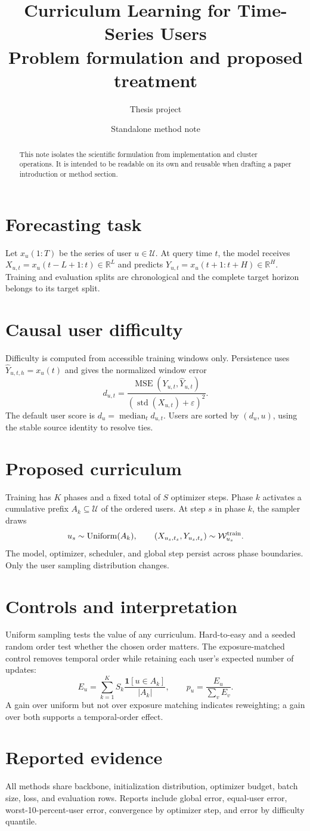 \documentclass[10pt]{article}
\title{\color{navy}Curriculum Learning for Time-Series Users\\[3pt]\large Problem formulation and proposed treatment}
\author{Thesis project}
\date{Standalone method note}
\newcommand{\R}{\mathbb{R}}
\begin{document}
\maketitle
\begin{abstract}
This note isolates the scientific formulation from implementation and cluster
operations. It is intended to be readable on its own and reusable when drafting
a paper introduction or method section.
\end{abstract}

\section{Forecasting task}
Let $x_u(1{:}T)$ be the series of user $u\in\mathcal U$. At query time $t$,
the model receives $X_{u,t}=x_u(t-L+1{:}t)\in\R^L$ and predicts
$Y_{u,t}=x_u(t+1{:}t+H)\in\R^H$. Training and evaluation splits are
chronological and the complete target horizon belongs to its target split.

\section{Causal user difficulty}
Difficulty is computed from accessible training windows only. Persistence uses
$\widehat Y_{u,t,h}=x_u(t)$ and gives the normalized window error
\[
 d_{u,t}=\frac{\operatorname{MSE}(Y_{u,t},\widehat Y_{u,t})}
 {(\operatorname{std}(X_{u,t})+\varepsilon)^2}.
\]
The default user score is $d_u=\operatorname{median}_t d_{u,t}$. Users are
sorted by $(d_u,u)$, using the stable source identity to resolve ties.

\section{Proposed curriculum}
Training has $K$ phases and a fixed total of $S$ optimizer steps. Phase $k$
activates a cumulative prefix $A_k\subseteq\mathcal U$ of the ordered users.
At step $s$ in phase $k$, the sampler draws
\[
  u_s\sim\operatorname{Uniform}(A_k),\qquad
  (X_{u_s,t_s},Y_{u_s,t_s})\sim\mathcal W_{u_s}^{\rm train}.
\]
The model, optimizer, scheduler, and global step persist across phase
boundaries. Only the user sampling distribution changes.

\section{Controls and interpretation}
Uniform sampling tests the value of any curriculum. Hard-to-easy and a seeded
random order test whether the chosen order matters. The exposure-matched
control removes temporal order while retaining each user's expected number of
updates:
\[
 E_u=\sum_{k=1}^K S_k\frac{\mathbf 1[u\in A_k]}{|A_k|},\qquad
 p_u=\frac{E_u}{\sum_v E_v}.
\]
A gain over uniform but not over exposure matching indicates reweighting; a
gain over both supports a temporal-order effect.

\section{Reported evidence}
All methods share backbone, initialization distribution, optimizer budget,
batch size, loss, and evaluation rows. Reports include global error,
equal-user error, worst-10-percent-user error, convergence by optimizer step,
and error by difficulty quantile.
\end{document}
